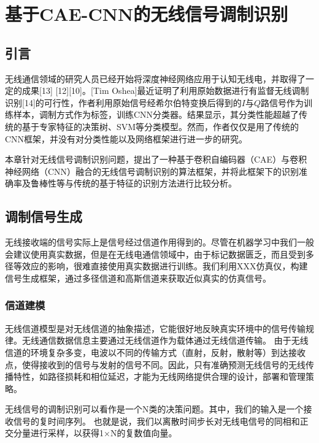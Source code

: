 \chapter{基于CAE-CNN的无线信号调制识别}

\section{引言}

无线通信领域的研究人员已经开始将深度神经网络应用于认知无线电，并取得了一定的成果[13] [12][10]。[Tim Oshea]最近证明了利用原始数据进行有监督无线调制识别[14]的可行性，作者利用原始信号经希尔伯特变换后得到的$I$与$Q$路信号作为训练样本，调制方式作为标签，训练CNN分类器。结果显示，其分类性能超越了传统的基于专家特征的决策树、SVM等分类模型。然而，作者仅仅是用了传统的CNN框架，并没有对分类性能以及网络框架进行进一步的研究。\par

本章针对无线信号调制识别问题，提出了一种基于卷积自编码器（CAE）与卷积神经网络（CNN）融合的无线信号调制识别的算法框架，并将此框架下的识别准确率及鲁棒性等与传统的基于特征的识别方法进行比较分析。\par


\section{调制信号生成}

无线接收端的信号实际上是信号经过信道作用得到的。尽管在机器学习中我们一般会建议使用真实数据，但是在无线电通信领域中，由于标记数据匮乏，而且受到多径等效应的影响，很难直接使用真实数据进行训练。我们利用XXX仿真仪，构建信号生成框架，通过多径信道和高斯信道来获取近似真实的仿真信号。\par


\subsection{信道建模}

无线信道模型是对无线信道的抽象描述，它能很好地反映真实环境中的信号传输规律。无线通信数据信息主要通过无线信道作为载体通过无线信道传输。 由于无线信道的环境复杂多变，电波以不同的传输方式（直射，反射，散射等）到达接收点，使得接收到的信号与发射的信号不同。因此，只有准确预测无线信号的无线传播特性，如路径损耗和相位延迟，才能为无线网络提供合理的设计，部署和管理策略。\par

无线信号的调制识别可以看作是一个N类的决策问题。其中，我们的输入是一个接收信号的复时间序列。
也就是说，我们以离散时间步长对无线电信号的同相和正交分量进行采样，以获得1×N的复数值向量。\par

